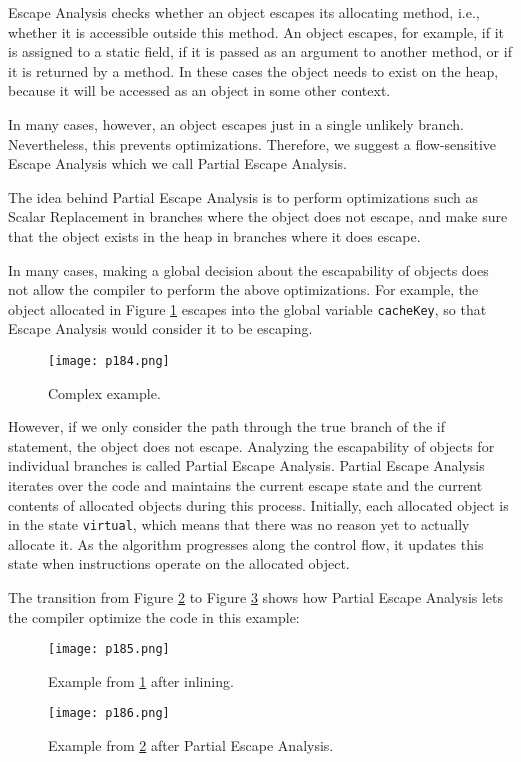 Escape Analysis checks whether an object escapes its allocating method, i.e., whether it is accessible outside this
method. An object escapes, for example, if it is assigned
to a static field, if it is passed as an argument to another
method, or if it is returned by a method. In these cases the
object needs to exist on the heap, because it will be accessed
as an object in some other context.

In many cases, however, an object escapes just in a single
unlikely branch. Nevertheless, this prevents optimizations.
Therefore, we suggest a flow-sensitive Escape Analysis which
we call Partial Escape Analysis.

The idea behind Partial Escape Analysis is to perform optimizations such as Scalar Replacement in branches where
the object does not escape, and make sure that the object
exists in the heap in branches where it does escape.


In many cases, making a global decision about the escapability of objects does not allow the compiler to perform the
above optimizations. For example, the object allocated in
Figure \ref{fig:p184}  escapes into the global variable \texttt{cacheKey}, so that
Escape Analysis would consider it to be escaping.
\begin{figure}[H]
	\centering
	\texttt{[image: p184.png]}
	\caption{Complex example.}
	\label{fig:p184}
\end{figure}

However, if we only consider the path through the true
branch of the if statement, the object does not escape. Analyzing the escapability of objects for individual branches is
called Partial Escape Analysis. Partial Escape Analysis iterates over the code and maintains the current escape state
and the current contents of allocated objects during this
process. Initially, each allocated object is in the state \texttt{virtual}, which means that there was no reason yet to actually
allocate it. As the algorithm progresses along the control
flow, it updates this state when instructions operate on the
allocated object.


The transition from Figure \ref{fig:p185} to Figure \ref{fig:p186} shows how Partial Escape Analysis lets the compiler optimize the code in
this example:

\begin{figure}[H]
	\centering
	\texttt{[image: p185.png]}
	\caption{Example from \ref{fig:p184} after inlining.}
	\label{fig:p185}
\end{figure}
\begin{figure}[H]
	\centering
	\texttt{[image: p186.png]}
	\caption{ Example from  \ref{fig:p185} after Partial
		Escape Analysis.}
	\label{fig:p186}
\end{figure}



